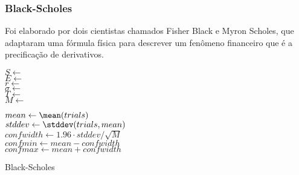 \subsubsection{Black-Scholes}

Foi elaborado por dois cientistas chamados Fisher Black e Myron Scholes, que adaptaram uma fórmula física para descrever um fenômeno financeiro que é a precificação de derivativos.

\begin{algorithm}[H]
\Indm\Indp
	\BlankLine

	$S \leftarrow$  \\
	$E \leftarrow$  \\
	$r \leftarrow$  \\
	$\sigma \leftarrow$  \\
	$T \leftarrow$  \\
	$M \leftarrow$ 
	\BlankLine

	\BlankLine

	$mean \leftarrow \mean(trials)$\\
	$stddev \leftarrow \stddev(trials, mean)$\\
	$confwidth \leftarrow 1.96 \cdot stddev / \sqrt{M}$\\
	$confmin \leftarrow mean - confwidth$\\
	$confmax \leftarrow mean + confwidth$\\
	\BlankLine
	\BlankLine
	\BlankLine

\caption{Black-Scholes \label{alg:bs}}
\end{algorithm}

